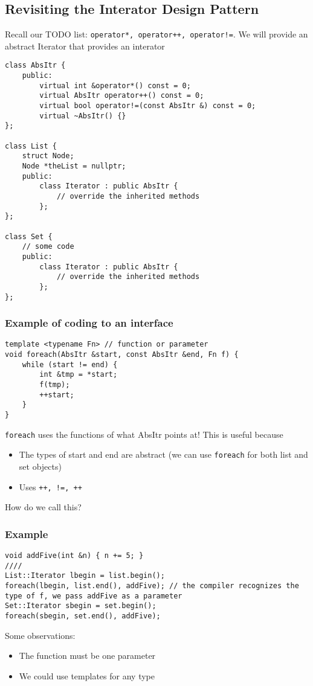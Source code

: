 \documentclass[12pt]{article}
\begin{document}
\subsection{Revisiting the Interator Design Pattern}
Recall our TODO list: \lstinline{operator*, operator++, operator!=}. We will provide an abstract Iterator that provides an interator
\begin{lstlisting}
class AbsItr {
    public:
        virtual int &operator*() const = 0;
        virtual AbsItr operator++() const = 0;
        virtual bool operator!=(const AbsItr &) const = 0;
        virtual ~AbsItr() {}
};

class List {
    struct Node;
    Node *theList = nullptr;
    public:
        class Iterator : public AbsItr {
            // override the inherited methods
        };
};

class Set {
    // some code
    public:
        class Iterator : public AbsItr {
            // override the inherited methods
        };
};
\end{lstlisting}

\subsubsection{Example of coding to an interface}
\begin{lstlisting}
template <typename Fn> // function or parameter
void foreach(AbsItr &start, const AbsItr &end, Fn f) {
    while (start != end) {
        int &tmp = *start;
        f(tmp);
        ++start;
    }
}
\end{lstlisting}
\lstinline{foreach} uses the functions of what AbsItr points at! This is useful because
\begin{itemize}
    \item The types of start and end are abstract (we can use \lstinline{foreach} for both list and set objects)
    \item Uses \lstinline{++, !=, ++}
\end{itemize}
How do we call this?
\subsubsection{Example}
\begin{lstlisting}
void addFive(int &n) { n += 5; }
////
List::Iterator lbegin = list.begin();
foreach(lbegin, list.end(), addFive); // the compiler recognizes the type of f, we pass addFive as a parameter
Set::Iterator sbegin = set.begin();
foreach(sbegin, set.end(), addFive);
\end{lstlisting}
Some observations:
\begin{itemize}
    \item The function must be one parameter
    \item We could use templates for any type
\end{itemize}
\end{document}
